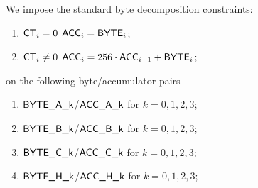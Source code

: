 We impose the standard byte decomposition constraints:
\begin{enumerate}
	\item \If $\textsf{CT}_{i} = 0$ \Then $\textsf{ACC}_{i} = \textsf{BYTE}_{i}$;
	\item \If $\textsf{CT}_{i} \neq 0$ \Then $\textsf{ACC}_{i} = 256 \cdot \textsf{ACC}_{i - 1} + \textsf{BYTE}_{i}$;
\end{enumerate}
on the following byte/accumulator pairs
\begin{multicols}{2}
\begin{enumerate}
	\item $\textsf{BYTE}\textsf{\_A\_k}$/$\textsf{ACC}\textsf{\_A\_k}$ for $k=0,1,2,3$;
	\item $\textsf{BYTE}\textsf{\_B\_k}$/$\textsf{ACC}\textsf{\_B\_k}$ for $k=0,1,2,3$;
	\item $\textsf{BYTE}\textsf{\_C\_k}$/$\textsf{ACC}\textsf{\_C\_k}$ for $k=0,1,2,3$;
	\item $\textsf{BYTE}\textsf{\_H\_k}$/$\textsf{ACC}\textsf{\_H\_k}$ for $k=0,1,2,3$;
\end{enumerate}
\end{multicols}
\noindent{}
